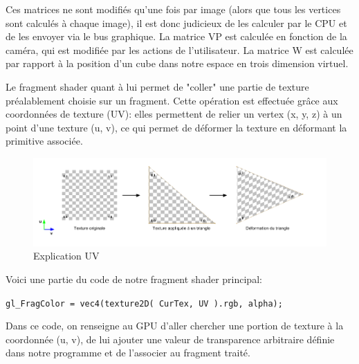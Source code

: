 Ces matrices ne sont modifiés qu'une fois par image (alors que tous les vertices sont calculés à chaque image), il est donc judicieux de les calculer par le CPU et de les envoyer via le bus graphique. La matrice VP est calculée en fonction de la caméra, qui est modifiée par les actions de l'utilisateur. La matrice W est calculée par rapport à la position d'un cube dans notre espace en trois dimension virtuel.

Le fragment shader quant à lui permet de "coller" une partie de texture préalablement choisie sur un fragment. Cette opération est effectuée grâce aux coordonnées de texture (UV): elles permettent de relier un vertex (x, y, z) à un point d'une texture (u, v), ce qui permet de déformer la texture en déformant la primitive associée.

\begin{figure}[h]
 \centering
 \includegraphics[scale=0.4,keepaspectratio=true]{img/uvexpl.png}
 \caption{Explication UV}
 \label{uv}
\end{figure}

Voici une partie du code de notre fragment shader principal:\newline

\verb|gl_FragColor = vec4(texture2D( CurTex, UV ).rgb, alpha);|\newline

Dans ce code, on renseigne au GPU d'aller chercher une portion de texture à la coordonnée (u, v), de lui ajouter une valeur de transparence arbitraire définie dans notre programme et de l'associer au fragment traité.
